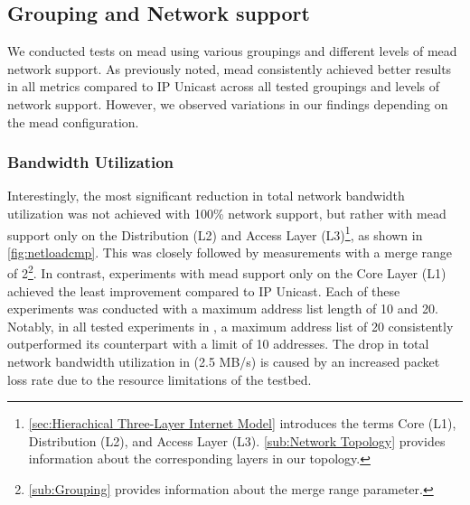 \subsection{Grouping and Network support} %
\label{sub:Results_Grouping and Network support}

We conducted tests on \gls{mead} using various groupings and different levels of
    \gls{mead} network support.
As previously noted, \gls{mead} consistently achieved better results in all
    metrics compared to IP Unicast across all tested groupings and levels of
    network support.
However, we observed variations in our findings depending on the \gls{mead}
    configuration.

\subsubsection{Bandwidth Utilization}
Interestingly, the most significant reduction in total network bandwidth
    utilization was not achieved with 100\% network support, but rather with
    \gls{mead} support only on the Distribution (L2) and Access Layer (L3)\footnote{
        \autoref{sec:Hierachical Three-Layer Internet Model} introduces the terms Core
            (L1), Distribution (L2), and Access Layer (L3).
        \autoref{sub:Network Topology} provides information about the corresponding
            layers in our topology.
    }, as shown in \autoref{fig:netloadcmp}.
This was closely followed by measurements with a merge range of 2\footnote{
        \autoref{sub:Grouping} provides information about the merge range parameter.
    }.
In contrast, experiments with \gls{mead} support only on the Core Layer (L1)
    achieved the least improvement compared to IP Unicast.
Each of these experiments was conducted with a maximum address list length of
    10 and 20.
Notably, in all tested experiments in \uci{}, a maximum address list of 20
    consistently outperformed its counterpart with a limit of 10 addresses.
The drop in total network bandwidth utilization in \uci{} (2.5 MB/s) is caused
    by an increased packet loss rate due to the resource limitations of the
    testbed.

